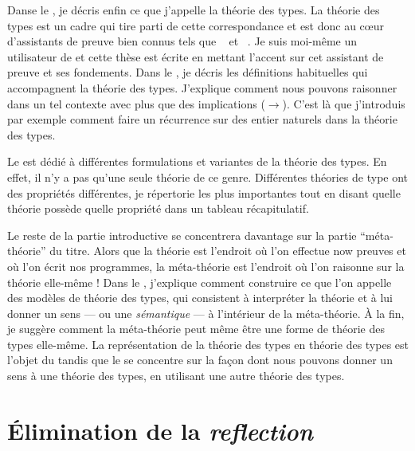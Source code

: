 Danse le , je décris enfin ce que j'appelle la théorie
des types.
La théorie des types est un cadre qui tire parti de cette correspondance et est donc au cœur d'assistants de preuve bien connus tels que
\Coq~ et \Agda~.
Je suis moi-même un utilisateur de \Coq et cette thèse est écrite en mettant
l'accent sur cet assistant de preuve et ses fondements.
Dans le , je décris les définitions habituelles qui
accompagnent la théorie des types.
J'explique comment nous pouvons raisonner dans un tel contexte avec plus que des
implications (\(\to\)).
%
C'est là que j'introduis par exemple comment faire un récurrence sur des entier
naturels dans la théorie des types.

Le  est dédié à différentes formulations et variantes de la
théorie des types. En effet, il n'y a pas qu'une seule théorie de ce genre.
Différentes théories de type ont des propriétés différentes, je répertorie les
plus importantes tout en disant quelle théorie possède quelle propriété dans un
tableau récapitulatif.

Le reste de la partie introductive se concentrera davantage sur la partie
``méta-théorie'' du titre. Alors que la théorie est l'endroit où l'on effectue now
preuves et où l'on écrit nos programmes, la méta-théorie est l'endroit où l'on raisonne sur la théorie elle-même !
Dans le , j'explique comment construire ce que l'on appelle des
modèles de théorie des types, qui consistent à interpréter la théorie et à lui
donner un sens --- ou une \emph{sémantique} --- à l'intérieur de la
méta-théorie. À la fin, je suggère comment la méta-théorie peut même être une
forme de théorie des types elle-même. La représentation de la théorie des types
en théorie des types est l'objet du  tandis que le
 se concentre sur la façon dont nous pouvons donner un sens à une théorie des types, en utilisant une autre théorie des types.

\section{Élimination de la \emph{reflection}}

